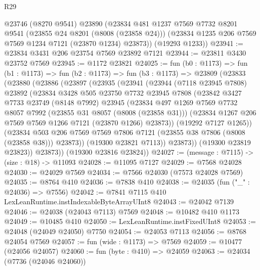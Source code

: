 \begin{lexlean}{R29}
\begin{coremodule}
      @23746
      (@8270 @9541)
      @23890
      (@23834
        @481
        @1237
        @7569
        @7732
        @8201
        @9541
        (@23855 @24 @8201 (@8008 (@23858 @24)))
        (@23834 @1235 @206 @7569 @7569 @1234 @7121 (@23870 @1234) @23873))
      (@19293 @1233))
@23941 := @23834 @3431 @206 @23754 @7569 @23892 @7121
@23944 := @23811 @3430 @23752 @7569
@23945 := @1172 @23821
@24025 := fun (b0 : @1173) =>
  fun (b1 : @1173) =>
  fun (b2 : @1173) =>
  fun (b3 : @1173) =>
  @23809
    (@23833
      (@23880
        (@23886
          (@23897
            (@23935
              (@23941
                (@23944
                  (@7118 @23945 @7808)
                  @23892
                  (@23834
                    @3428
                    @505
                    @23750
                    @7732
                    @23945
                    @7808
                    (@23842
                      @3427
                      @7733
                      @23749
                      (@8148 @7992)
                      @23945
                      (@23834
                        @497
                        @1269
                        @7569
                        @7732
                        @8057
                        @7992
                        (@23855 @31 @8057 (@8008 (@23858 @31)))
                        (@23834 @1267 @206 @7569 @7569 @1266 @7121 (@23870 @1266) @23873))
                      (@19292 @7127 @1265))
                    (@23834
                      @503
                      @206
                      @7569
                      @7569
                      @7806
                      @7121
                      (@23855 @38 @7806 (@8008 (@23858 @38)))
                      @23873))
                  (@19300 @23821 @7113))
                @23873))
            (@19300 @23819 @23823))
          @23873))
      (@19300 @23816 @23824))
@24027 := (message : @7115) -> (size : @18) -> @11093
@24028 := @11095 @7127
@24029 := @7568 @24028
@24030 := @24029 @7569
@24034 := @7566 @24030 (@7573 @24028 @7569)
@24035 := @8764 @410
@24036 := @7838 @410
@24038 := @24035 (fun ("_" : @24036) => @7556)
@24042 := @7841 @7115 @410 LexLeanRuntime.instIndexableByteArrayUInt8
@24043 := @24042 @7139
@24046 := @24038 (@24043 @7113) @7569
@24048 := @10482 @410 @1173
@24049 := @10485 @410
@24050 := LexLeanRuntime.instFixedUInt8
@24053 := @24048 (@24049 @24050) @7750
@24054 := @24053 @7113
@24056 := @8768 @24054 @7569
@24057 := fun (wide : @1173) => @7569
@24059 := @10477 (@24056 @24057)
@24060 := fun (byte : @410) => @24059
@24063 := @24034 (@7736 (@24046 @24060))

\end{coremodule}
\end{lexlean}

